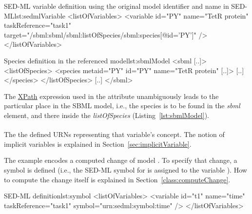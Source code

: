 \begin{myXmlLst}{SED-ML variable definition using the original model identifier and name in SED-ML}{lst:sedmlVariable}
<listOfVariables>
	<variable id="PY" name="TetR protein"  taskReference="task1" 
		target="/sbml:sbml/sbml:listOfSpecies/sbml:species[@id='PY']" />
</listOfVariables>
\end{myXmlLst}

\begin{myXmlLst}{Species definition in the referenced model}{lst:sbmlModel}
<sbml [..]>
	<listOfSpecies>
		<species metaid="PY" id="PY" name="TetR protein" [..]>
		[..]
		</species>
 	</listOfSpecies>
 	[..]
</sbml>
\end{myXmlLst}

The \hyperref[sec:xpath]{XPath} expression used in the  attribute unambiguously leads to the particular place in the SBML model, i.e., the species is to be found in the \emph{sbml} element, and there inside the \emph{listOfSpecies} (Listing~\ref{lst:sbmlModel}). 

\paragraph*{}
\label{sec:symbol}
The   the defined URNs representing that variable's concept. The notion of implicit variables is explained in Section~\ref{sec:implicitVariable}.


The example encodes a computed change of model . To specify that change, a symbol is defined (i.e., the SED-ML symbol for  is assigned to the variable ). How to compute the change itself is explained in Section~\ref{class:computeChange}.

\begin{myXmlLst}{SED-ML  definition}{lst:symbol}
<listOfVariables>
	<variable id="t1" name="time" taskReference="task1" symbol="urn:sedml:symbol:time" />
</listOfVariables>
\end{myXmlLst}

